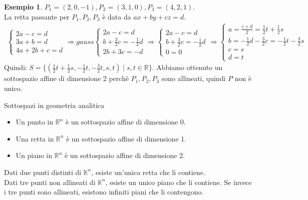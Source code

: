 \documentclass[a4paper]{article}
\theoremstyle{definition}
\newtheorem*{es}{Esempio}
\begin{document}
	\begin{es}
		$P_1 = (2, 0, -1), P_2 = (3, 1, 0), P_3 = (4, 2, 1)$. \\
		La retta passante per $P_1, P_2, P_3$ è data da $ax + by + cz = d$.
		\begin{align*}
			\begin{cases}
				2a - c = d \\
				3a + b = d \\
				4a + 2b + c = d
			\end{cases} \Rightarrow gauss \begin{cases}
				2a - c = d \\
				b + \frac{3}{2}c = -\frac{1}{2}d \\
				2b + 3c = -d
			\end{cases} \Rightarrow \begin{cases}
				2a - c = d \\
				b + \frac{3}{2}c = -\frac{1}{2}d \\
				0 = 0
			\end{cases} \Rightarrow \begin{cases}
				a = \frac{c + d}{2} = \frac{1}{2}t + \frac{1}{2}s \\
				b = -\frac{1}{2}d - \frac{3}{2}c = -\frac{1}{2}t - \frac{3}{2}s \\
				c = s \\
				d = t
			\end{cases}
		\end{align*}
		Quindi: $S = \{(\frac{1}{2}t + \frac{1}{2}s, -\frac{1}{2}t, -\frac{3}{2}t , s, t) \mid s, t \in \mathbb{R}\}$.
		Abbiamo ottenuto un sottospazio affine di dimensione 2 perchè $P_1, P_2, P_3$ sono allineati, quindi $P$ non è unico.
	\end{es}

	\begin{deff}{Sottospazi in geometria analitica}{}
		\begin{itemize}
			\item Un punto in $\mathbb{R}^n$ è un sottospazio affine di dimensione 0.
			\item Una retta in $\mathbb{R}^n$ è un sottospazio affine di dimensione 1.
			\item Un piano in $\mathbb{R}^n$ è un sottospazio affine di dimensione 2.
		\end{itemize}
		Dati due punti distinti di $\mathbb{K}^n$, esiste un'unica retta che li contiene. \\
		Dati tre punti non allineati di $\mathbb{K}^n$, esiste un unico piano che li contiene.
		Se invece i tre punti sono allineati, esistono infiniti piani che li contengono.
	\end{deff}
\end{document}
